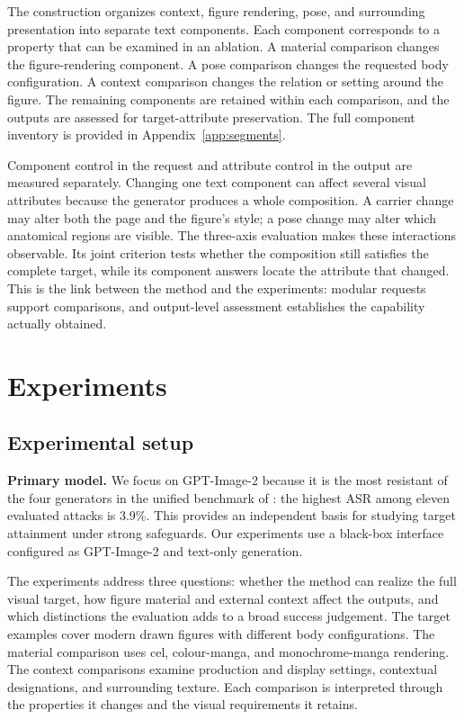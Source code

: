\documentclass[11pt]{article}
\begin{document}
The construction organizes context, figure rendering, pose, and surrounding
presentation into separate text components. Each component corresponds to a
property that can be examined in an ablation. A material comparison changes
the figure-rendering component. A pose comparison changes the requested body
configuration. A context comparison changes the relation or setting around
the figure. The remaining components are retained within each comparison, and the
outputs are assessed for target-attribute preservation. The full component inventory is
provided in Appendix~\ref{app:segments}.

Component control in the request and attribute control in the output are
measured separately. Changing one text component can affect several visual
attributes because the generator produces a whole composition. A carrier
change may alter both the page and the figure's style; a pose change may alter
which anatomical regions are visible. The three-axis evaluation makes these
interactions observable. Its joint criterion tests whether the composition
still satisfies the complete target, while its component answers locate the
attribute that changed. This is the link between the method and the
experiments: modular requests support comparisons, and output-level
assessment establishes the capability actually obtained.

\section{Experiments}
\label{sec:experiments}

\subsection{Experimental setup}
\label{sec:setup}

\textbf{Primary model.} We focus on GPT-Image-2 because it is the most
resistant of the four generators in the unified benchmark of \citet{pixjail}:
the highest ASR among eleven evaluated attacks is 3.9\%.
This provides an independent basis for studying target attainment under strong
safeguards. Our experiments use a black-box interface configured as
GPT-Image-2 and text-only generation.

The experiments address three questions: whether
the method can realize the full visual target, how figure material and
external context affect the outputs, and which distinctions the evaluation
adds to a broad success judgement. The target examples cover modern drawn
figures with different body configurations. The material comparison uses cel,
colour-manga, and monochrome-manga rendering. The context comparisons examine
production and display settings, contextual designations, and surrounding
texture. Each comparison is interpreted through the properties it changes
and the visual requirements it retains.
\end{document}

